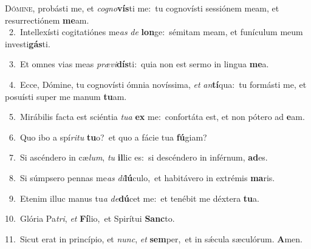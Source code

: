 \lettrine{\initial\textcolor{\initialcolor}{D}}{ómine,} probásti me, et \textit{co}\-\textit{gno}\textbf{vís}ti me:~\star tu cognovísti sessiónem meam, et resurrectiónem \textbf{me}\-am.\\
{\numbfont\textcolor{\numbcolor}{~2.}}~Intellexísti cogitatiónes me\textit{as} \textit{de} \textbf{lon}\-ge:~\star sémitam meam, et funículum meum investi\-\textbf{gás}\-ti.\par
{\numbfont\textcolor{\numbcolor}{~3.}}~Et omnes vias meas \textit{præ}\-\textit{vi}\textbf{dís}ti:~\star quia non est sermo in lingua \textbf{me}\-a.\par
{\numbfont\textcolor{\numbcolor}{~4.}}~Ecce, Dómine, tu cognovísti ómnia novíssima, \textit{et} \textit{an}\-\textbf{tí}qua:~\star tu formásti me, et posuísti super me manum \textbf{tu}\-am.\par
{\numbfont\textcolor{\numbcolor}{~5.}}~Mirábilis facta est sciéntia \textit{tu}\-\textit{a} \textbf{ex} me:~\star confortáta est, et non pótero ad \textbf{e}\-am.\par
{\numbfont\textcolor{\numbcolor}{~6.}}~Quo ibo a spí\-\textit{ri}\-\textit{tu} \textbf{tu}\-o?~\star et quo a fácie tua \textbf{fú}\-giam?\par
{\numbfont\textcolor{\numbcolor}{~7.}}~Si ascéndero in cæ\-\textit{lum}\-, \textit{tu} \textbf{il}\-lic es:~\star si descéndero in inférnum, \textbf{ad}\-es.\par
{\numbfont\textcolor{\numbcolor}{~8.}}~Si súmpsero pennas me\textit{as} \textit{di}\-\textbf{lú}culo,~\star et habitávero in extrémis \textbf{ma}\-ris.\par
{\numbfont\textcolor{\numbcolor}{~9.}}~Etenim illuc manus tu\textit{a} \textit{de}\-\textbf{dú}cet me:~\star et tenébit me déxtera \textbf{tu}\-a.\par
{\numbfont\textcolor{\numbcolor}{10.}}~Glória Pa\-\textit{tri}\-, \textit{et} \textbf{Fí}\-lio,~\star et Spirítui \textbf{Sanc}\-to.\par
{\numbfont\textcolor{\numbcolor}{11.}}~Sicut erat in princípio, et \textit{nunc}\-, \textit{et} \textbf{sem}\-per,~\star et in sǽcula sæculórum. \textbf{A}\-men.\par
